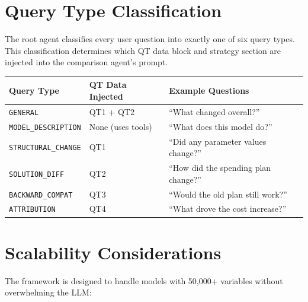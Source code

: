 \documentclass[11pt, a4paper]{article}
\begin{document}
\section{Query Type Classification}

The root agent classifies every user question into exactly one of six
query types.  This classification determines which QT data block and
strategy section are injected into the comparison agent's prompt.

\begin{longtable}{p{3.5cm} p{4cm} p{6.5cm}}
\toprule
\textbf{Query Type} & \textbf{QT Data Injected} & \textbf{Example Questions} \\
\midrule
\texttt{GENERAL} & QT1 + QT2 &
    ``What changed overall?'' \\
\midrule
\texttt{MODEL\_DESCRIPTION} & None (uses tools) &
    ``What does this model do?'' \\
\midrule
\texttt{STRUCTURAL\_CHANGE} & QT1 &
    ``Did any parameter values change?'' \\
\midrule
\texttt{SOLUTION\_DIFF} & QT2 &
    ``How did the spending plan change?'' \\
\midrule
\texttt{BACKWARD\_COMPAT} & QT3 &
    ``Would the old plan still work?'' \\
\midrule
\texttt{ATTRIBUTION} & QT4 &
    ``What drove the cost increase?'' \\
\bottomrule
\end{longtable}


\section{Scalability Considerations}

The framework is designed to handle models with 50,000+ variables without
overwhelming the LLM:
\end{document}
